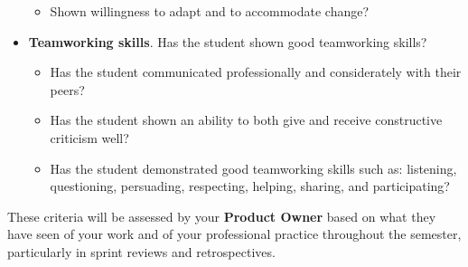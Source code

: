 \documentclass{../../fal_assignment}
\begin{document}
\begin{itemize}
\begin{itemize}
			\item  Shown willingness to adapt and to accommodate change?
		\end{itemize}
	\item \textbf{Teamworking skills}. Has the student shown good teamworking skills?
		\begin{itemize}
			\item  Has the student communicated professionally and considerately with their peers?
			\item  Has the student shown an ability to both give and receive constructive criticism well?
			\item  Has the student demonstrated good teamworking skills such as: listening, questioning,
			persuading, respecting, helping, sharing, and participating?
		\end{itemize}
\end{itemize}

These criteria will be assessed by your \textbf{Product Owner} based on what they have seen of your work
and of your professional practice throughout the semester,
particularly in sprint reviews and retrospectives.
\end{document}
